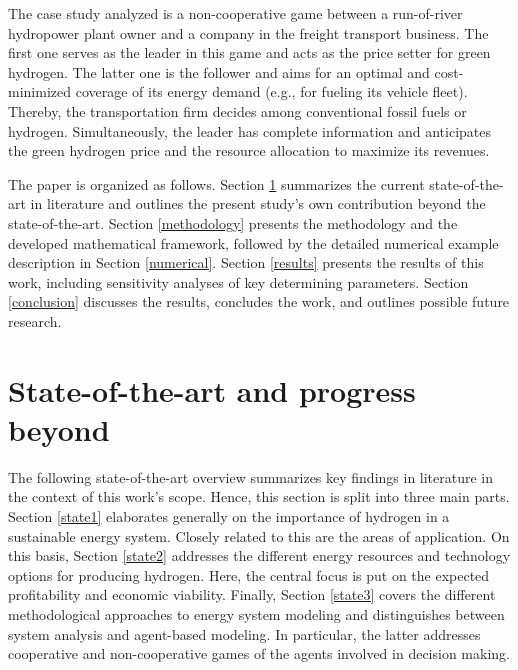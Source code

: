 \documentclass[review]{elsarticle}
\begin{document}
The case study analyzed is a non-cooperative game between a run-of-river hydropower plant owner and a company in the freight transport business. The first one serves as the leader in this game and acts as the price setter for green hydrogen. The latter one is the follower and aims for an optimal and cost-minimized coverage of its energy demand (e.g., for fueling its vehicle fleet). Thereby, the transportation firm decides among conventional fossil fuels or hydrogen. Simultaneously, the leader has complete information and anticipates the green hydrogen price and the resource allocation to maximize its revenues.\vspace{0.3cm} 

The paper is organized as follows. Section \ref{stateoftheart} summarizes the current state-of-the-art in literature and outlines the present study's own contribution beyond the state-of-the-art. Section \ref{methodology} presents the methodology and the developed mathematical framework, followed by the detailed numerical example description in Section \ref{numerical}. Section \ref{results} presents the results of this work, including sensitivity analyses of key determining parameters. Section \ref{conclusion} discusses the results, concludes the work, and outlines possible future research.

\section{State-of-the-art and progress beyond}\label{stateoftheart}
The following state-of-the-art overview summarizes key findings in literature in the context of this work's scope. Hence, this section is split into three main parts. Section \ref{state1} elaborates generally on the importance of hydrogen in a sustainable energy system. Closely related to this are the areas of application. On this basis, Section \ref{state2} addresses the different energy resources and technology options for producing hydrogen. Here, the central focus is put on the expected profitability and economic viability. Finally, Section \ref{state3} covers the different methodological approaches to energy system modeling and distinguishes between system analysis and agent-based modeling. In particular, the latter addresses cooperative and non-cooperative games of the agents involved in decision making. 
\end{document}

